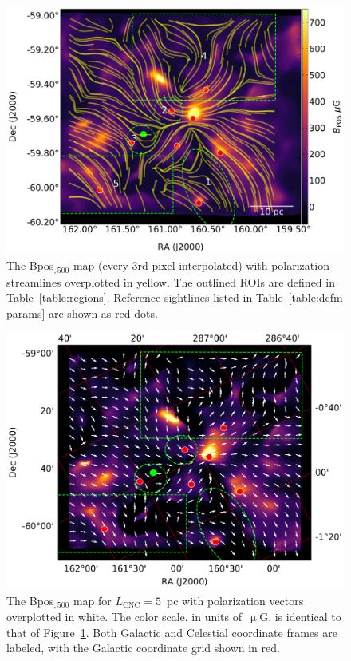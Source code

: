 \begin{figure}[!htbp]
\centering
\includegraphics[width=\textwidth]{figures/carina/cftHI_5arcmin_500_5p0pc}
\caption[The  map (every 3rd pixel interpolated) with polarization streamlines overplotted in yellow.]{The \gls{Bpos}$_{,500}$ map (every 3rd pixel interpolated) with polarization streamlines overplotted in yellow. The outlined ROIs are defined in Table~\ref{table:regions}. Reference sightlines listed in Table~\ref{table:dcfm params} are shown as red dots.}
\label{fig:DCFM_5_500}
\end{figure}

\begin{figure}[!htbp]
\centering
\includegraphics[width=\textwidth]{figures/carina/B_vectors_500_5p0pc}
\caption[The  map for ~pc with polarization vectors overplotted in white.]{The \gls{Bpos}$_{,500}$ map for $L_{\mathrm{CNC}} = 5$~pc with polarization vectors overplotted in white. The color scale, in units of~$\upmu$G, is identical to that of Figure~\ref{fig:DCFM_5_500}. Both Galactic and Celestial coordinate frames are labeled, with the Galactic coordinate grid shown in red.}
\label{fig:Bpos_vectors}
\end{figure}

